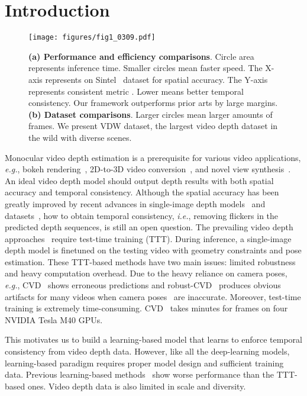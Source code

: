\documentclass[10pt,twocolumn,letterpaper]{article}
\def\data{VDW}
\begin{document}
\section{Introduction}
\label{sec:introduction}

\begin{figure}[!t]
\centering
\texttt{[image: figures/fig1\_0309.pdf]}
\vspace{-30pt}
\caption{\textbf{(a) Performance and efficiency comparisons}. Circle area represents inference time. Smaller circles mean faster speed.
The X-axis represents  on Sintel~\cite{sintel} dataset for spatial accuracy.  The Y-axis represents consistent metric . Lower  means better temporal consistency. Our framework outperforms prior arts by large margins.  \textbf{ (b) Dataset comparisons}. 
Larger circles mean larger amounts of frames. We present \data{} dataset, the largest video depth dataset in the wild with diverse scenes.}
\label{fig:fig1}
\end{figure}

Monocular video depth estimation is a prerequisite for various video applications, \textit{e.g.}, bokeh rendering~\cite{bokehme,videobokeh,luo2023defocus}, 2D-to-3D video conversion~\cite{n1}, and novel view synthesis~\cite{diudiu1,diudiu2}. 
An ideal video depth model should output depth results with both spatial accuracy and temporal consistency.
Although the spatial accuracy has been greatly improved by recent advances in single-image depth models~\cite{dpt,midas,zhuzhu1,newcrfs,ljq} and datasets~\cite{mega,kexian2020,kexian2018}, how to obtain temporal consistency, \textit{i.e.}, removing flickers in the predicted depth sequences, is still an open question. The prevailing video depth approaches~\cite{CVD,rcvd,dycvd} require test-time training (TTT). During inference, a single-image depth model is finetuned on the testing video with geometry constraints and pose estimation. These TTT-based methods have two main issues: limited robustness and heavy computation overhead. Due to the heavy reliance on camera poses, \textit{e.g.}, CVD~\cite{CVD} shows erroneous predictions and robust-CVD~\cite{rcvd} produces obvious artifacts for many videos when camera poses~\cite{colmapsfm,rcvd} are inaccurate. Moreover, test-time training is extremely time-consuming. CVD~\cite{CVD} takes  minutes for  frames on four NVIDIA Tesla M40 GPUs.

This motivates us to build a learning-based model that learns to enforce temporal consistency from video depth data. However, like all the deep-learning models, learning-based paradigm requires proper model design and sufficient training data. Previous learning-based methods~\cite{deepv2d,fmnet,ST-CLSTM,MM21} show worse performance than the TTT-based ones. Video depth data is also limited in scale and diversity. 
\end{document}
